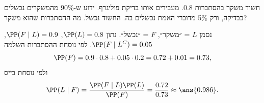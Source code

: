 חשוד משקר בהסתברות 0.8. מעבירים אותו בדיקת פוליגרף. ידוע ש-90\% מהמשקרים נכשלים בבדיקה, ורק 5\% מדוברי האמת נכשלים בה. החשוד נכשל. מה ההסתברות שהוא משקר?
\begin{solbox}
נסמן $L$ = ״משקר״, $F$ = ״נכשל״. נתון $\PP(L)=0.8$, $\PP(F\mid L)=0.9$, $\PP(F\mid L^C)=0.05$. לפי נוסחת ההסתברות השלמה
\[
\PP(F)=0.9\cdot0.8+0.05\cdot0.2=0.72+0.01=0.73,
\]
ולפי נוסחת בייס
\[
\PP(L\mid F)=\frac{\PP(F\mid L)\PP(L)}{\PP(F)}=\frac{0.72}{0.73}\approx\ans{0.986}.
\]
\end{solbox}
